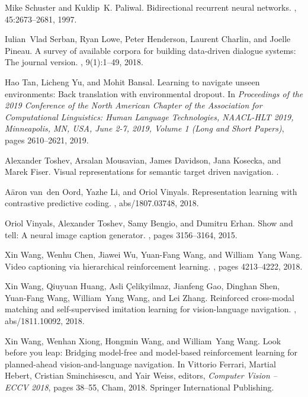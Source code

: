 \documentclass[10pt,twocolumn,letterpaper]{article}
\begin{document}
\begin{thebibliography}{10}
Mike Schuster and Kuldip~K. Paliwal.
\newblock Bidirectional recurrent neural networks.
, 45:2673--2681, 1997.

Iulian~Vlad Serban, Ryan Lowe, Peter Henderson, Laurent Charlin, and Joelle
  Pineau.
\newblock A survey of available corpora for building data-driven dialogue
  systems: The journal version.
, 9(1):1--49, 2018.

Hao Tan, Licheng Yu, and Mohit Bansal.
\newblock Learning to navigate unseen environments: Back translation with
  environmental dropout.
\newblock In {\em Proceedings of the 2019 Conference of the North American
  Chapter of the Association for Computational Linguistics: Human Language
  Technologies, {NAACL-HLT} 2019, Minneapolis, MN, USA, June 2-7, 2019, Volume
  1 (Long and Short Papers)}, pages 2610--2621, 2019.

Alexander Toshev, Arsalan Mousavian, James Davidson, Jana Kosecka, and Marek
  Fiser.
\newblock Visual representations for semantic target driven navigation.
.

A{\"a}ron van~den Oord, Yazhe Li, and Oriol Vinyals.
\newblock Representation learning with contrastive predictive coding.
, abs/1807.03748, 2018.

Oriol Vinyals, Alexander Toshev, Samy Bengio, and Dumitru Erhan.
\newblock Show and tell: A neural image caption generator.
, pages 3156--3164, 2015.

Xin Wang, Wenhu Chen, Jiawei Wu, Yuan-Fang Wang, and William~Yang Wang.
\newblock Video captioning via hierarchical reinforcement learning.
, pages 4213--4222, 2018.

Xin Wang, Qiuyuan Huang, Asli {\c{C}}elikyilmaz, Jianfeng Gao, Dinghan Shen,
  Yuan{-}Fang Wang, William~Yang Wang, and Lei Zhang.
\newblock Reinforced cross-modal matching and self-supervised imitation
  learning for vision-language navigation.
, abs/1811.10092, 2018.

Xin Wang, Wenhan Xiong, Hongmin Wang, and William~Yang Wang.
\newblock Look before you leap: Bridging model-free and model-based
  reinforcement learning for planned-ahead vision-and-language navigation.
\newblock In Vittorio Ferrari, Martial Hebert, Cristian Sminchisescu, and Yair
  Weiss, editors, {\em Computer Vision -- ECCV 2018}, pages 38--55, Cham, 2018.
  Springer International Publishing.


\end{thebibliography}
\end{document}
